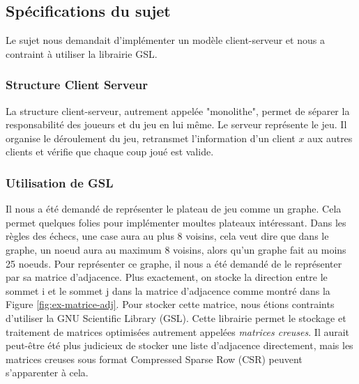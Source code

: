 \subsection{Spécifications du sujet}
Le sujet nous demandait d'implémenter un modèle client-serveur et nous a
contraint à utiliser la librairie GSL.

\subsubsection{Structure Client Serveur}

La structure client-serveur, autrement appelée "monolithe", permet de séparer
la responsabilité des joueurs et du jeu en lui même. Le serveur représente le jeu. Il organise le
déroulement du jeu, retransmet l'information d'un client $x$ aux autres clients et vérifie que chaque coup joué est valide.

\subsubsection{Utilisation de GSL}

Il nous a été demandé de représenter le plateau de jeu comme un graphe.
Cela permet quelques folies pour implémenter moultes plateaux intéressant.
Dans les règles des échecs, une case aura au plus 8 voisins, cela veut dire que dans le graphe, un noeud aura au maximum 8 voisins, alors qu'un graphe fait au moins 25 noeuds.
Pour représenter ce graphe, il nous a été demandé de le représenter par sa matrice d'adjacence.
Plus exactement, on stocke la direction entre le sommet i et le sommet j dans la matrice d'adjacence comme montré dans la Figure \ref{fig:ex-matrice-adj}.
Pour stocker cette matrice, nous étions contraints d'utiliser la GNU Scientific Library (GSL).
Cette librairie permet le stockage et traitement de matrices optimisées autrement appelées \textit{matrices creuses}.
Il aurait peut-être été plus judicieux de stocker une liste d'adjacence directement, mais les matrices creuses sous format Compressed Sparse Row (CSR) peuvent s'apparenter à cela.

